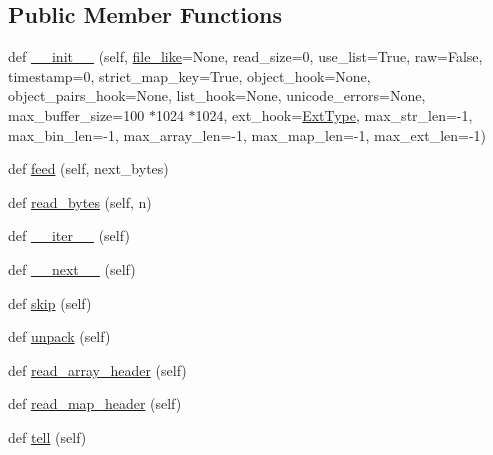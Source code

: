 \subsection*{Public Member Functions}
\begin{DoxyCompactItemize}
\item 
def \hyperlink{classpip_1_1__vendor_1_1msgpack_1_1fallback_1_1Unpacker_ad4296e668817d2f33b8999edfbf6f47d}{\+\_\+\+\_\+init\+\_\+\+\_\+} (self, \hyperlink{classpip_1_1__vendor_1_1msgpack_1_1fallback_1_1Unpacker_a0688f673a943509486c55d2754c2deed}{file\+\_\+like}=None, read\+\_\+size=0, use\+\_\+list=True, raw=False, timestamp=0, strict\+\_\+map\+\_\+key=True, object\+\_\+hook=None, object\+\_\+pairs\+\_\+hook=None, list\+\_\+hook=None, unicode\+\_\+errors=None, max\+\_\+buffer\+\_\+size=100 $\ast$1024 $\ast$1024, ext\+\_\+hook=\hyperlink{classpip_1_1__vendor_1_1msgpack_1_1ext_1_1ExtType}{Ext\+Type}, max\+\_\+str\+\_\+len=-\/1, max\+\_\+bin\+\_\+len=-\/1, max\+\_\+array\+\_\+len=-\/1, max\+\_\+map\+\_\+len=-\/1, max\+\_\+ext\+\_\+len=-\/1)
\item 
def \hyperlink{classpip_1_1__vendor_1_1msgpack_1_1fallback_1_1Unpacker_a7a28f68c1e94d76a2412b8b2f54d986a}{feed} (self, next\+\_\+bytes)
\item 
def \hyperlink{classpip_1_1__vendor_1_1msgpack_1_1fallback_1_1Unpacker_a2f55056f432a3f7750618eba7a433ebd}{read\+\_\+bytes} (self, n)
\item 
def \hyperlink{classpip_1_1__vendor_1_1msgpack_1_1fallback_1_1Unpacker_a0598a730129601f0a8c20f38d5cee2d9}{\+\_\+\+\_\+iter\+\_\+\+\_\+} (self)
\item 
def \hyperlink{classpip_1_1__vendor_1_1msgpack_1_1fallback_1_1Unpacker_acf1141aad67e740403cbaaf71de0ef44}{\+\_\+\+\_\+next\+\_\+\+\_\+} (self)
\item 
def \hyperlink{classpip_1_1__vendor_1_1msgpack_1_1fallback_1_1Unpacker_acca264a46a3b28c6905f79962a7e56f9}{skip} (self)
\item 
def \hyperlink{classpip_1_1__vendor_1_1msgpack_1_1fallback_1_1Unpacker_a5879154aa0c51b6d9277b6a82b0bf35b}{unpack} (self)
\item 
def \hyperlink{classpip_1_1__vendor_1_1msgpack_1_1fallback_1_1Unpacker_a31d3db0cecbb067973b67674fc41df42}{read\+\_\+array\+\_\+header} (self)
\item 
def \hyperlink{classpip_1_1__vendor_1_1msgpack_1_1fallback_1_1Unpacker_afa2dc33a0fb42c52cace4cb5ef4a2355}{read\+\_\+map\+\_\+header} (self)
\item 
def \hyperlink{classpip_1_1__vendor_1_1msgpack_1_1fallback_1_1Unpacker_a255bac291f68a0e186ecf02725e79943}{tell} (self)
\end{DoxyCompactItemize}
